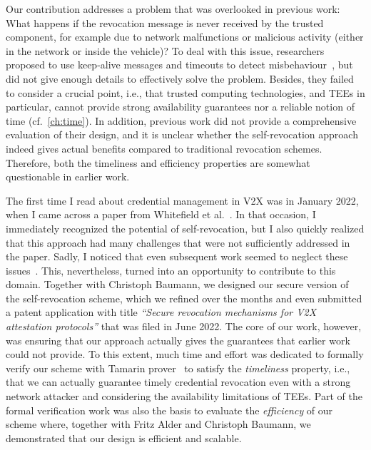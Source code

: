 Our contribution addresses a problem that was overlooked in previous work: What
happens if the revocation message is never received by the trusted component,
for example due to network malfunctions or malicious activity (either in the
network or inside the vehicle)? To deal with this issue, researchers proposed to
use keep-alive messages and timeouts to detect
misbehaviour~\cite{forster2015rewire,whitefield2017privacy}, but did not give
enough details to effectively solve the problem. Besides, they failed to
consider a crucial point, i.e., that trusted computing technologies, and
\acsp{TEE} in particular, cannot provide strong availability guarantees nor a
reliable notion of time (cf.~\cref{ch:time}). In addition, previous work did not
provide a comprehensive evaluation of their design, and it is unclear whether
the self-revocation approach indeed gives actual benefits compared to
traditional revocation schemes. Therefore, both the timeliness and efficiency
properties are somewhat questionable in earlier work.

The first time I read about credential management in \ac{V2X} was in January
2022, when I came across a paper from Whitefield et
al.~\cite{whitefield2017privacy}. In that occasion, I immediately recognized the
potential of self-revocation, but I also quickly realized that this approach had
many challenges that were not sufficiently addressed in the paper. Sadly, I
noticed that even subsequent work seemed to neglect these
issues~\cite{desmoulins2019practical,larsen2021daa}. This, nevertheless, turned
into an opportunity to contribute to this domain. Together with Christoph
Baumann, we designed our secure version of the self-revocation scheme, which we
refined over the months and even submitted a patent application with title
\emph{``Secure revocation mechanisms for V2X attestation protocols''} that was
filed in June 2022. The core of our work, however, was ensuring that our
approach actually gives the guarantees that earlier work could not provide. To
this extent, much time and effort was dedicated to formally verify our scheme
with Tamarin prover~\cite{meier2013tamarin} to satisfy the \emph{timeliness}
property, i.e., that we can actually guarantee timely credential revocation even
with a strong network attacker and considering the availability limitations of
\acsp{TEE}. Part of the formal verification work was also the basis to evaluate
the \emph{efficiency} of our scheme where, together with Fritz Alder and
Christoph Baumann, we demonstrated that our design is efficient and scalable.


